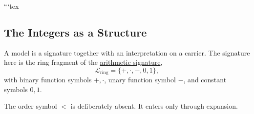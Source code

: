 ```tex
%
%

\subsection{The Integers as a Structure}
\label{subsec:integers-as-a-structure}



\begin{remark*}[Exposition]
A model is a signature together with an interpretation on a carrier. The
signature here is the ring fragment of the
\hyperref[def:arithmetic-signature]{arithmetic signature},
\[
\mathcal{L}_{\mathrm{ring}}
=
\{+,\cdot,-,0,1\},
\]
with binary function symbols $+,\cdot$, unary function symbol $-$, and
constant symbols $0,1$.

The order symbol $<$ is deliberately absent. It enters only through expansion.
\end{remark*}



